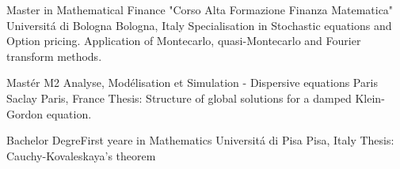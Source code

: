 \begin{cventries}
    


  \cventry
    {Master in Mathematical Finance "Corso Alta Formazione Finanza Matematica"}
    {Universit\'a di Bologna}
    {Bologna, Italy}
    {}
    {
    Specialisation in Stochastic equations and Option pricing. Application of Montecarlo, quasi-Montecarlo and Fourier transform methods.
    }
    
    
    \cventry
    {Mastér M2 Analyse, Modélisation et Simulation  - Dispersive equations}
    {Paris Saclay}
    {Paris, France}
    {}
    {
    Thesis: Structure of global solutions for a damped Klein-Gordon equation.
    }
    
    
    \cventry
    {Bachelor DegreFirst yeare in Mathematics}
    {Universit\'a di Pisa}
    {Pisa, Italy}{}
    {Thesis: Cauchy-Kovaleskaya's theorem}
    

\end{cventries}
